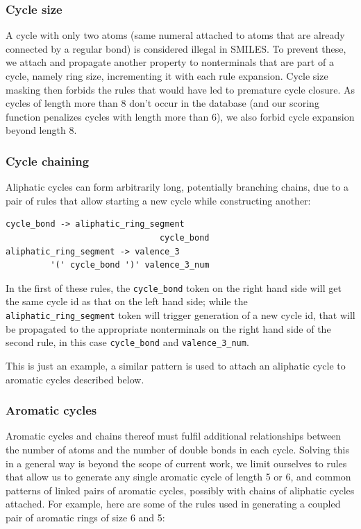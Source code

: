 \documentclass{article}
\begin{document}
\subsubsection{Cycle size}
A cycle with only two atoms (same numeral attached to atoms that are already connected by a regular bond) is considered illegal in SMILES. To prevent these, we attach and propagate another property to nonterminals that are part of a cycle, namely ring size, incrementing it with each rule expansion. Cycle size masking then forbids the rules that would have led to premature cycle closure. As cycles of length more than 8 don't occur in the database (and our scoring function penalizes cycles with length more than 6), we also forbid cycle expansion beyond length 8.
\subsubsection{Cycle chaining}
Aliphatic cycles can form arbitrarily long, potentially branching chains, due to a pair of rules that allow starting a new cycle while constructing another:
{\footnotesize \begin{verbatim}
cycle_bond -> aliphatic_ring_segment 
                               cycle_bond
aliphatic_ring_segment -> valence_3 
         '(' cycle_bond ')' valence_3_num
\end{verbatim}}
In the first of these rules, the \verb|cycle_bond| token on the right hand side will get the same cycle id as that on the left hand side; while the \verb|aliphatic_ring_segment| token will trigger generation of a new cycle id, that will be propagated to the appropriate nonterminals on the right hand side of the second rule, in this case \verb|cycle_bond| and \verb|valence_3_num|.

This is just an example, a similar pattern is used to attach an aliphatic cycle to aromatic cycles described below. 
\subsubsection{Aromatic cycles}
Aromatic cycles and chains thereof must fulfil additional relationships between the number of atoms and the number of double bonds in each cycle. Solving this in a general way is beyond the scope of current work, we limit ourselves to rules that allow us to generate any single aromatic cycle of length 5 or 6, and common patterns of linked pairs of aromatic cycles, possibly with chains of aliphatic cycles attached. For example, here are some of the rules used in generating a coupled pair of aromatic rings of size 6 and 5:
\end{document}
